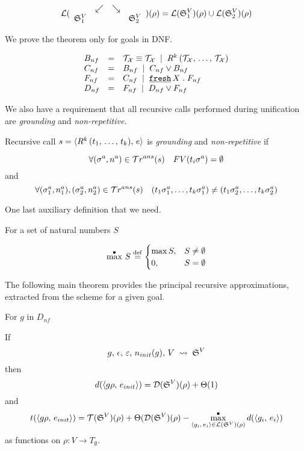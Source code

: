 \[ \mathcal{L}(\begin{array}{cccc} & \swarrow & \searrow \\ \mathfrak{S}_1^{V} & & & \mathfrak{S}_2^{V} \end{array})(\rho) =
      \mathcal{L}(\mathfrak{S}_1^{V})(\rho) \cup \mathcal{L}(\mathfrak{S}_2^{V})(\rho) \]

We prove the theorem only for goals in DNF.

\[
\begin{array}{lcl}
B_{nf} & = &  \mathcal{T}_\mathcal{X} \equiv \mathcal{T}_\mathcal{X} \; \mid \;
                     R^k\,(\mathcal{T}_\mathcal{X}, \, \dots, \, \mathcal{T}_\mathcal{X}) \\
C_{nf} & = & B_{nf} \; \mid \; C_{nf} \lor B_{nf} \\
F_{nf} & = & C_{nf} \; \mid \; \texttt{\underline {fresh}} \, X\;.\; F_{nf} \\
D_{nf} & = & F_{nf} \; \mid \; D_{nf} \lor F_{nf}
\end{array}
\]

We also have a requirement that all recursive calls performed during unification are \emph{grounding} and \emph{non-repetitive}.

\begin{definition}
Recursive call $s = \langle R^k\,(t_1, \, \dots, \, t_k) ,\, e \rangle$ is \emph{grounding} and \emph{non-repetitive} if 

\[ \forall (\sigma^{a}, n^{a}) \in \mathcal{T}r^{ans}(s) \quad FV(t_i \sigma^{a}) = \emptyset \]
and
\[ \forall (\sigma_1^{a}, n_1^{a}), (\sigma_2^{a}, n_2^{a}) \in \mathcal{T}r^{ans}(s) \quad (t_1 \sigma_1^{a}, \dots, t_k \sigma_1^{a}) \ne (t_1 \sigma_2^{a}, \dots, t_k \sigma_2^{a}) \]
\end{definition}

One last auxiliary definition that we need.

\begin{definition}

For a set of natural numbers $S$

\[
\max^{\bullet} \, S \overset{\mathrm{def}}{=}
\begin{cases}
\max S,  & S \ne \emptyset \\
0, & S = \emptyset\\
\end{cases}
\]

\end{definition}

The following main theorem provides the principal recursive approximations, extracted from the scheme for a given goal.
 
\begin{theorem}
For $g$ in $D_{nf}$ 

If \[  g, \, \epsilon, \, \varepsilon, \, n_{init}(g), \, V \; \rightsquigarrow \; \mathfrak{S}^{V}  \]
  then \[ d(\langle g\rho ,\, e_{init} \rangle) = \mathcal{D}(\mathfrak{S}^{V})(\rho) + \Theta(1) \]
  and
  \[ t(\langle g\rho ,\, e_{init} \rangle) = \mathcal{T}(\mathfrak{S}^{V})(\rho) + \Theta(\mathcal{D}(\mathfrak{S}^{V})(\rho)
  - \max^{\bullet}\limits_{\langle g_i ,\, e_i \rangle \in \mathcal{L}(\mathfrak{S}^{V})(\rho)} d(\langle g_i ,\, e_i \rangle) \]
  as functions on $\rho \colon V \to T_{\emptyset}$.
\end{theorem}

